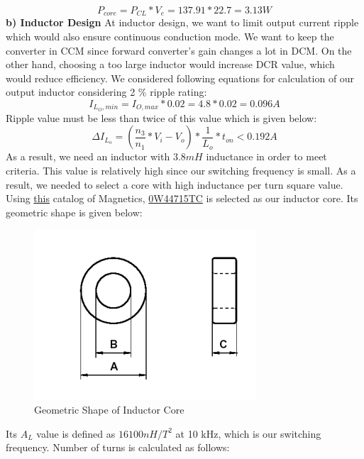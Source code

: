 \documentclass{article}
\newcommand\tab[1][1cm]{\hspace*{#1}}
\begin{document}
\begin{equation*}
   P_{core}=P_{CL}*V_e=137.91*22.7=3.13 W
\end{equation*}
\tab\textbf{b) Inductor Design}
\newline \tab At inductor design, we want to limit output current ripple which would also ensure continuous conduction mode. We want to keep the converter in CCM since forward converter's gain changes a lot in DCM. On the other hand, choosing a too large inductor would increase DCR value, which would reduce efficiency. We considered following equations for calculation of our output inductor considering 2 \% ripple rating:
\begin{equation*}
    I_{L_O,min}=I_{O,max}*0.02 =4.8*0.02=0.096 A
\end{equation*}
Ripple value must be less than twice of this value which is given below:
\begin{equation*}
{\displaystyle \Delta }I_{L_o}=(\frac{n_3}{n_1}*V_i-V_o)*\frac{1}{L_o}*t_{on}<0.192 A
\end{equation*}
\tab As a result, we need an inductor with $3.8 mH$ inductance in order to meet criteria. This value is relatively high since our switching frequency is small. As a result, we needed to select a core with high inductance per turn square value. Using \href{https://www.mag-inc.com/getattachment/Products/Ferrite-Cores/Learn-More-about-Ferrite-Cores/Magnetics-Ferrite-Catalog-2017.pdf?lang=en-US}{this} catalog of Magnetics, \href{https://www.mag-inc.com/Media/Magnetics/Datasheets/0W44715TC.pdf}{0W44715TC} is selected as our inductor core. Its geometric shape is given below:
\begin{figure}[H]
    \centering
    \includegraphics[scale=0.4]{inductor.PNG}
    \caption{Geometric Shape of Inductor Core}
    \label{fig:my_label}
\end{figure}
Its $A_L$ value is defined as $16100 nH/T^2$ at 10 kHz, which is our switching frequency. Number of turns is calculated as follows:
\end{document}

